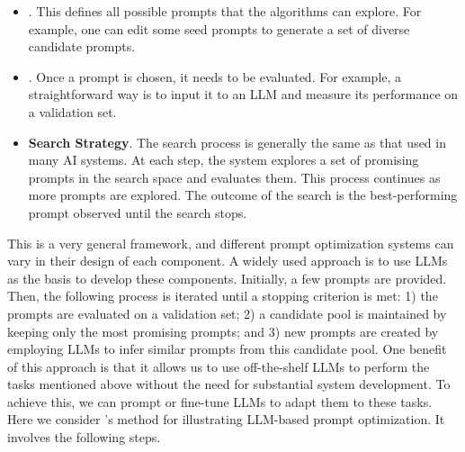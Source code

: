 \begin{itemize}
\item \vspace{0.5em} . This defines all possible prompts that the algorithms can explore. For example, one can edit some seed prompts to generate a set of diverse candidate prompts.
\item \vspace{0.3em} . Once a prompt is chosen, it needs to be evaluated. For example, a straightforward way is to input it to an LLM and measure its performance on a validation set.
\item \vspace{0.3em} \textbf{Search Strategy}. The search process is generally the same as that used in many AI systems. At each step, the system explores a set of promising prompts in the search space and evaluates them. This process continues as more prompts are explored. The outcome of the search is the best-performing prompt observed until the search stops.
\end{itemize}
\vspace{0.5em}

This is a very general framework, and different prompt optimization systems can vary in their design of each component. A widely used approach is to use LLMs as the basis to develop these components. Initially, a few prompts are provided. Then, the following process is iterated until a stopping criterion is met: 1) the prompts are evaluated on a validation set; 2) a candidate pool is maintained by keeping only the most promising prompts; and 3) new prompts are created by employing LLMs to infer similar prompts from this candidate pool. One benefit of this approach is that it allows us to use off-the-shelf LLMs to perform the tasks mentioned above without the need for substantial system development. To achieve this, we can prompt or fine-tune LLMs to adapt them to these tasks. Here we consider \citet{zhou-etal:2023large}'s method for illustrating LLM-based prompt optimization. It involves the following steps.

